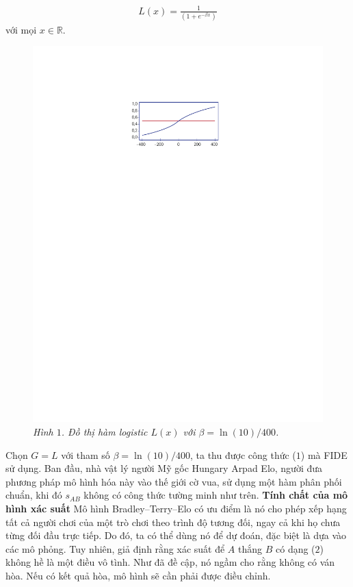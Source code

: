 \begin{multicols}{2}
	\vspace{-15pt}
	\begin{align*}
		L(x) = \frac{ 1 }{ (1 + e^{-\beta x}) }\tag{$3$}
	\end{align*}
	với mọi $x \in \mathbb R$.
	\begin{figure}[H]
		\centering
		\captionsetup{labelformat= empty, justification=centering}
		\includegraphics[width= 0.8\linewidth]{pic1}
		\caption{\small\textit{\color{toanhocdoisong}Hình $1$. Đồ thị hàm logistic $L(x)$ với $\beta = \ln(10) / 400$.}}
		\vspace*{-10pt}
	\end{figure}
	Chọn $G = L$ với tham số $\beta = \ln(10) / 400$, ta thu được công thức ($1$) mà FIDE sử dụng. Ban đầu, nhà vật lý người Mỹ gốc Hungary Arpad Elo, người đưa phương pháp mô hình hóa này vào thế giới cờ vua, sử dụng một hàm phân phối chuẩn, khi đó $s_{AB}$ không có công thức tường minh như trên.
	\vskip 0.05cm
	\textbf{\color{toanhocdoisong}Tính chất của mô hình xác suất}
	\vskip 0.05cm
	Mô hình Bradley--Terry--Elo có ưu điểm là nó cho phép xếp hạng tất cả người chơi của một trò chơi theo trình độ tương đối, ngay cả khi họ chưa từng đối đầu trực tiếp. Do đó, ta có thể dùng nó để dự đoán, đặc biệt là dựa vào các mô phỏng.
	Tuy nhiên, giả định rằng xác suất để $A$ thắng $B$ có dạng ($2$) không hề là một điều vô tình. Như đã đề cập, nó ngầm cho rằng không có ván hòa. Nếu có kết quả hòa, mô hình sẽ cần phải được điều chỉnh.

\end{multicols}
